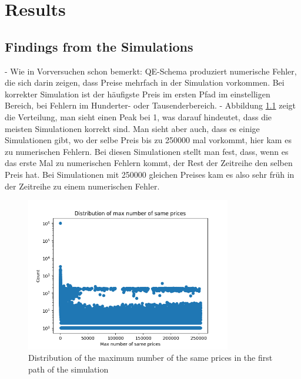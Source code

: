 \chapter{Results}
\label{sec:results}

\section{Findings from the Simulations}
- Wie in Vorversuchen schon bemerkt: QE-Schema produziert numerische Fehler, die sich darin zeigen, dass Preise mehrfach in der Simulation vorkommen. Bei korrekter Simulation ist der häufigste Preis im ersten Pfad im einstelligen Bereich, bei Fehlern im Hunderter- oder Tausenderbereich.
- Abbildung \ref{fig:max_number_of_same_prices_distribution} zeigt die Verteilung, man sieht einen Peak bei 1, was darauf hindeutet, dass die meisten Simulationen korrekt sind. Man sieht aber auch, dass es einige Simulationen gibt, wo der selbe Preis bis zu 250000 mal vorkommt, hier kam es zu numerischen Fehlern. Bei diesen Simulationen stellt man fest, dass, wenn es das erste Mal zu numerischen Fehlern kommt, der Rest der Zeitreihe den selben Preis hat. Bei Simulationen mit 250000 gleichen Preises kam es also sehr früh in der Zeitreihe zu einem numerischen Fehler.

\begin{figure}
    \centering
    \includegraphics[width=0.8\textwidth]{img/max_number_of_same_prices_distribution.png}
    \caption{Distribution of the maximum number of the same prices in the first path of the simulation}
    \label{fig:max_number_of_same_prices_distribution}
\end{figure}

